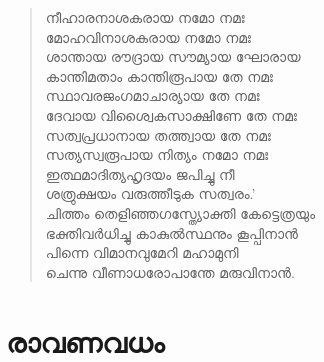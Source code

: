 \begin{verse}
നീഹാരനാശകരായ നമോ നമഃ\\
മോഹവിനാശകരായ നമോ നമഃ\\
ശാന്തായ രൗദ്രായ സൗമ്യായ ഘോരായ\\
കാന്തിമതാം കാന്തിരൂപായ തേ നമഃ\\
സ്ഥാവരജംഗമാചാര്യായ തേ നമഃ\\
ദേവായ വിശ്വൈകസാക്ഷിണേ തേ നമഃ\\
സത്വപ്രധാനായ തത്ത്വായ തേ നമഃ\\
സത്യസ്വരൂപായ നിത്യം നമോ നമഃ\\
ഇത്ഥമാദിത്യഹൃദയം ജപിച്ചു നീ\\
ശത്രുക്ഷയം വരുത്തീടുക സത്വരം.’\\
ചിത്തം തെളിഞ്ഞഗസ്ത്യോക്തി കേട്ടെത്രയും\\
ഭക്തിവര്‍ധിച്ചു കാകുല്‍സ്ഥനും കൂപ്പിനാന്‍\\
പിന്നെ വിമാനവുമേറി മഹാമുനി\\
ചെന്നു വീണാധരോപാന്തേ മരുവിനാന്‍.
\end{verse}


\section{രാവണവധം}

